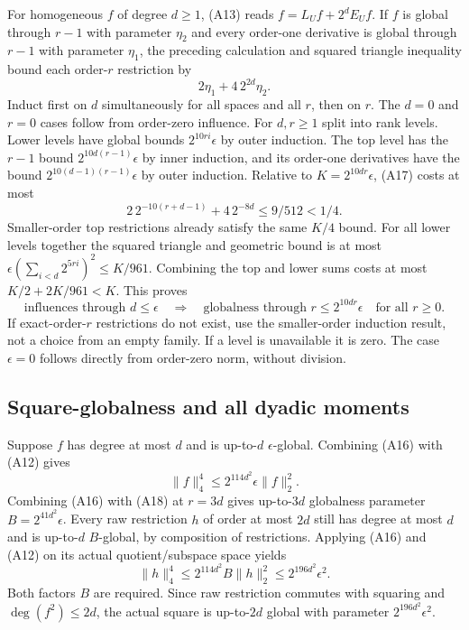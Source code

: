For homogeneous $f$ of degree $d\ge1$, (A13) reads
$f=L_Uf+2^dE_Uf$. If $f$ is global through $r-1$ with parameter $\eta_2$
and every order-one derivative is global through $r-1$ with parameter
$\eta_1$, the preceding calculation and squared triangle inequality
bound each order-$r$ restriction by
\[
 2\eta_1+4\,2^{2d}\eta_2.                          \tag{A17}
\]
Induct first on $d$ simultaneously for all spaces and all $r$, then on
$r$. The $d=0$ and $r=0$ cases follow from order-zero influence.
For $d,r\ge1$ split into rank levels. Lower levels have global bounds
$2^{10ri}\epsilon$ by outer induction. The top level has the
$r-1$ bound $2^{10d(r-1)}\epsilon$ by inner induction, and its
order-one derivatives have the bound
$2^{10(d-1)(r-1)}\epsilon$ by outer induction.
Relative to $K=2^{10dr}\epsilon$, (A17) costs at most
\[
 2\,2^{-10(r+d-1)}+4\,2^{-8d}\le9/512<1/4.
\]
Smaller-order top restrictions already satisfy the same $K/4$ bound.
For all lower levels together the squared triangle and geometric bound
is at most
$\epsilon(\sum_{i<d}2^{5ri})^2\le K/961$.
Combining the top and lower sums costs at most
$K/2+2K/961<K$. This proves
\[
 \text{influences through $d$}\le\epsilon
 \quad\Longrightarrow\quad
 \text{globalness through $r$}\le2^{10dr}\epsilon
 \quad\text{for all }r\ge0.                       \tag{A18}
\]
If exact-order-$r$ restrictions do not exist, use the smaller-order
induction result, not a choice from an empty family. If a level is
unavailable it is zero. The case $\epsilon=0$ follows directly from
order-zero norm, without division.

\subsection{Square-globalness and all dyadic moments}
Suppose $f$ has degree at most $d$ and is up-to-$d$
$\epsilon$-global. Combining (A16) with (A12) gives
\[
 \|f\|_4^4\le2^{114d^2}\epsilon\|f\|_2^2.           \tag{A19}
\]
Combining (A16) with (A18) at $r=3d$ gives up-to-$3d$ globalness
parameter $B=2^{41d^2}\epsilon$.
Every raw restriction $h$ of order at most $2d$ still has degree at most
$d$ and is up-to-$d$ $B$-global, by composition of restrictions.
Applying (A16) and (A12) on its actual quotient/subspace space yields
\[
 \|h\|_4^4\le2^{114d^2}B\|h\|_2^2
              \le2^{196d^2}\epsilon^2.              \tag{A20}
\]
Both factors $B$ are required. Since raw restriction commutes with
squaring and $\deg(f^2)\le2d$, the actual square is up-to-$2d$ global
with parameter $2^{196d^2}\epsilon^2$.

